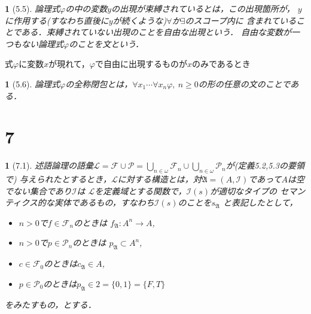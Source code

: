 \documentclass[a4j,10.5pt,oneside,openany]{jsbook}
\theoremstyle{mystyle}
\newtheorem{dfn}[thm]{\color{PakistanGreen}{定義}}
\begin{document}
	\begin{screen}
		\begin{dfn}[5.5]
			論理式$\varphi$の中の変数$y$の出現が束縛されているとは，この出現箇所が，
			$y$に作用する(すなわち直後に$y$が続くような)$\forall$か$\exists$のスコープ内に
			含まれていることである．束縛されていない出現のことを自由な出現という．
			自由な変数が一つもない論理式$\varphi$のことを文という．
		\end{dfn}
	\end{screen}
	
	式$\varphi$に変数$x$が現れて，$\varphi$で自由に出現するものが$x$のみであるとき
	
	\begin{screen}
		\begin{dfn}[5.6]
			論理式$\varphi$の全称閉包とは，$\forall x_{1} \cdots \forall x_{n} \varphi,
			\ n \geq 0$の形の任意の文のことである．
		\end{dfn}
	\end{screen}
	
\section{7}
	\begin{screen}
		\begin{dfn}[7.1]
			述語論理の語彙$\mathcal{L} = \mathcal{F} \cup \mathcal{P}
			= \bigcup_{n \in \omega} \mathcal{F}_{n} \cup
			\bigcup_{n \in \omega} \mathcal{P}_{n}$が(定義5.2,5.3の要領で)
			与えられたとするとき，$\mathcal{L}$に対する構造とは，対$\mathfrak{A}
			= (A,\mathcal{I})$であって$A$は空でない集合であり$\mathcal{I}$は
			$\mathcal{L}$を定義域とする関数で，$\mathcal{I}(s)$が適切なタイプの
			セマンティクス的な実体であるもの，すなわち$\mathcal{I}(s)$のことを$s_{\mathfrak{A}}$
			と表記したとして，
			\begin{itemize}
				\item $n > 0$で$f \in \mathcal{F}_{n}$のときは
					$f_{\mathfrak{A}}:A^{n} \rightarrow A$,
				\item $n > 0$で$p \in \mathcal{P}_{n}$のときは
					$p_{\mathfrak{A}} \subset A^{n}$,
				\item $c \in \mathcal{F}_{0}$のときは$c_{\mathfrak{A}} \in A$,
				\item $p \in \mathcal{P}_{0}$のときは$p_{\mathfrak{A}} \in 2 
					= \{0,1\} = \{F,T\}$
			\end{itemize}
			をみたすもの，とする．
		\end{dfn}
	\end{screen}
	
\end{document}
